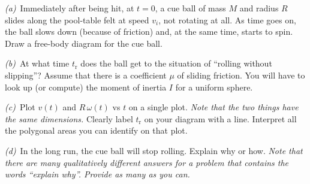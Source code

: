 \documentclass[12pt]{article}
\begin{document}
\begin{pottproblem}
\textsl{(a)}~Immediately after being hit, at $t=0$, a cue ball of mass
$M$ and radius $R$ slides along the pool-table felt at speed $v_i$, not rotating
at all.  As time goes on, the ball slows down (because of friction)
and, at the same time, starts to spin.  Draw a free-body diagram for
the cue ball.

\textsl{(b)}~At what time $t_\mathrm{r}$ does the ball get to the
situation of ``rolling without slipping''?  Assume that there is a
coefficient $\mu$ of sliding friction. You will have to look up (or
compute) the moment of inertia $I$ for a uniform sphere.

\textsl{(c)}~Plot $v(t)$ and $R\,\omega(t)$ vs $t$ on a single plot.
\emph{Note that the two things have the same
dimensions.}  Clearly label $t_\mathrm{r}$ on your diagram with a
line.
Interpret all the polygonal areas you can identify on that plot.

\textsl{(d)}~In the long run, the cue ball will stop rolling. Explain
why or how. \emph{Note that there are many qualitatively different
answers for a problem that contains the words ``explain why''.
Provide as many as you can.}
\end{pottproblem}
\end{document}
